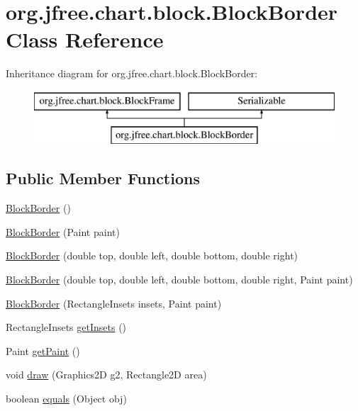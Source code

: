 \hypertarget{classorg_1_1jfree_1_1chart_1_1block_1_1_block_border}{}\section{org.\+jfree.\+chart.\+block.\+Block\+Border Class Reference}
\label{classorg_1_1jfree_1_1chart_1_1block_1_1_block_border}
Inheritance diagram for org.\+jfree.\+chart.\+block.\+Block\+Border\+:\begin{figure}[H]
\begin{center}
\leavevmode
\includegraphics[height=2.000000cm]{classorg_1_1jfree_1_1chart_1_1block_1_1_block_border}
\end{center}
\end{figure}
\subsection*{Public Member Functions}
\begin{DoxyCompactItemize}
\item 
\mbox{\hyperlink{classorg_1_1jfree_1_1chart_1_1block_1_1_block_border_a670ab57d4676a42418aad66ede351e48}{Block\+Border}} ()
\item 
\mbox{\hyperlink{classorg_1_1jfree_1_1chart_1_1block_1_1_block_border_a6bc3ab09035e6d7f134ce51ec8304953}{Block\+Border}} (Paint paint)
\item 
\mbox{\hyperlink{classorg_1_1jfree_1_1chart_1_1block_1_1_block_border_a3c6a6f24cb30637cefbe79fed065ea77}{Block\+Border}} (double top, double left, double bottom, double right)
\item 
\mbox{\hyperlink{classorg_1_1jfree_1_1chart_1_1block_1_1_block_border_a977b030ae62ca95aacb34fa7c88a448b}{Block\+Border}} (double top, double left, double bottom, double right, Paint paint)
\item 
\mbox{\hyperlink{classorg_1_1jfree_1_1chart_1_1block_1_1_block_border_a0f418f107c881324ccacc87d29a7392a}{Block\+Border}} (Rectangle\+Insets insets, Paint paint)
\item 
Rectangle\+Insets \mbox{\hyperlink{classorg_1_1jfree_1_1chart_1_1block_1_1_block_border_a4507b8ff587d8d3f75ffa5e4996e19c2}{get\+Insets}} ()
\item 
Paint \mbox{\hyperlink{classorg_1_1jfree_1_1chart_1_1block_1_1_block_border_a0b48caa217926ee928eca1c146d6e523}{get\+Paint}} ()
\item 
void \mbox{\hyperlink{classorg_1_1jfree_1_1chart_1_1block_1_1_block_border_af76639888de7329092e0432ad264ada6}{draw}} (Graphics2D g2, Rectangle2D area)
\item 
boolean \mbox{\hyperlink{classorg_1_1jfree_1_1chart_1_1block_1_1_block_border_a9009dd671a133d1172fe283d7f79da7d}{equals}} (Object obj)
\end{DoxyCompactItemize}

